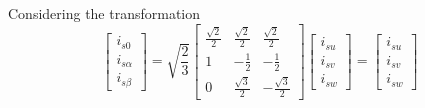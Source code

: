 \documentclass[12pt,a4paper]{scrartcl}
\begin{document}
\begin{onehalfspace}
Considering the transformation 
\begin{equation} \label{eq32}
	\left[
	\begin{matrix}
		i_{s0}		\\[6pt]
		i_{s\alpha} \\[6pt]
		i_{s\beta}
	\end{matrix} \right] = \sqrt{\frac{2}{3}}
	\left[
	\begin{matrix}
		\frac{\sqrt{2}}{2} & \frac{\sqrt{2}}{2} & \frac{\sqrt{2}}{2} \\[6pt]
		1 & -\frac{1}{2} & -\frac{1}{2} \\[6pt]
		0 & \frac{\sqrt{3}}{2} & -\frac{\sqrt{3}}{2}
	\end{matrix} \right]
	\left[
	\begin{matrix}
		i_{su} \\[6pt]
		i_{sv} \\[6pt]
		i_{sw}
	\end{matrix} \right] = 
	\left[
	\begin{matrix}
		i_{su} \\[6pt]
		i_{sv} \\[6pt]
		i_{sw}
	\end{matrix} \right]
\end{equation}


\end{onehalfspace}
\end{document}
